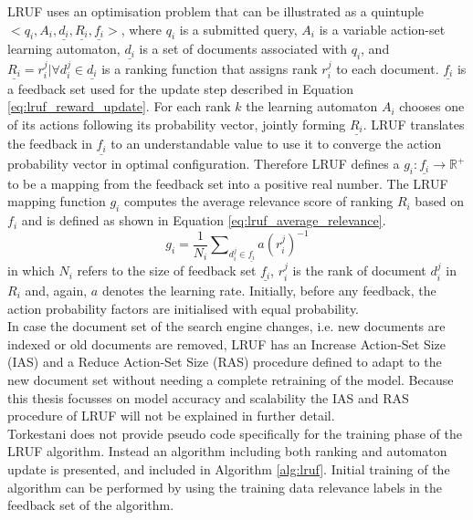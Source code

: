 LRUF uses an optimisation problem that can be illustrated as a quintuple $<q_i,A_i,\underline{d_i},\underline{R_i},\underline{f_i}>$, where $q_i$ is a submitted query, $A_i$ is a variable action-set learning automaton, $\underline{d_i}$ is a set of documents associated with $q_i$, and $\underline{R_i}={r_i^j|\forall d_i^j \in \underline{d_i}}$ is a ranking function that assigns rank $r_i^j$ to each document. $\underline{f_i}$ is a feedback set used for the update step described in Equation \ref{eq:lruf_reward_update}. For each rank $k$ the learning automaton $A_i$ chooses one of its actions following its probability vector, jointly forming $\underline{R_i}$. LRUF translates the feedback in $\underline{f_i}$ to an understandable value to use it to converge the action probability vector in optimal configuration. Therefore LRUF defines a $g_i: \underline{f_i} \rightarrow \mathbb{R}^{+}$ to be a mapping from the feedback set into a positive real number. The LRUF mapping function $g_i$ computes the average relevance score of ranking $R_i$ based on $f_i$ and is defined as shown in Equation \ref{eq:lruf_average_relevance}.
\begin{equation}
g_i=\frac{1}{N_i}\sum\nolimits_{d_{i}^{j}\in \underline{f_i}} a(r_{i}^{j})^{-1}
\label{eq:lruf_average_relevance}
\end{equation}
\noindent in which $N_i$ refers to the size of feedback set $\underline{f_i}$, $r_i^j$ is the rank of document $d_i^j$ in $R_i$ and, again, $a$ denotes the learning rate. Initially, before any feedback, the action probability factors are initialised with equal probability.\\

In case the document set of the search engine changes, i.e. new documents are indexed or old documents are removed, LRUF has an Increase Action-Set Size (IAS) and a Reduce Action-Set Size (RAS) procedure defined to adapt to the new document set without needing a complete retraining of the model. Because this thesis focusses on model accuracy and scalability the IAS and RAS procedure of LRUF will not be explained in further detail.\\

Torkestani \cite{Torkestani2012b} does not provide pseudo code specifically for the training phase of the LRUF algorithm. Instead an algorithm including both ranking and automaton update is presented, and included in Algorithm \ref{alg:lruf}. Initial training of the algorithm can be performed by using the training data relevance labels in the feedback set of the algorithm.

